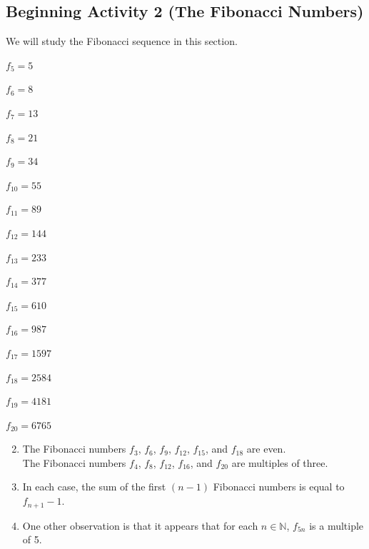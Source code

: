 \documentclass[11pt]{article}
\begin{document}
\newpage
\subsection*{Beginning Activity 2 (The Fibonacci Numbers)}
We will study the Fibonacci sequence in this section.

\begin{multicols}{4}
$f_5  = 5$

$f_6  = 8$

$f_7  = 13$

$f_8  = 21$

$f_9  = 34$

$f_{10}  = 55$

$f_{11}  = 89$

$f_{12}  = 144$

$f_{13}  = 233$

$f_{14}  = 377$

$f_{15}  = 610$

$f_{16}  = 987$

$f_{17}  = 1597$

$f_{18}  = 2584$

$f_{19}  = 4181$

$f_{20}  = 6765$

%
%
%
\end{multicols}

\begin{enumerate} \setcounter{enumi}{1}
\item  The Fibonacci numbers $f_3$, $f_6$, $f_9$, $f_{12}$, $f_{15}$, and $f_{18}$ are even.  \\
The Fibonacci numbers $f_4$, $f_8$, $f_{12}$, $f_{16}$, and $f_{20}$ are multiples of three.

\item In each case, the sum of the first $(n - 1)$ Fibonacci numbers is equal to $f_{n+1} - 1$.
\item One other observation is that it appears that for each  $n \in \mathbb{N}$,  $f_{5n} $  is a multiple of 5.
\end{enumerate}
\hbreak
\end{document}
